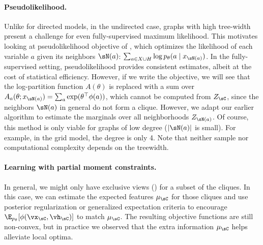 \paragraph{Pseudolikelihood.}
Unlike for directed models, in the undirected case,
graphs with high tree-width present a challenge
for even fully-supervised maximum likelihood.
This motivates looking at pseudolikelihood objective of \citep{besag75pseudo},
which optimizes the likelihood of each variable $a$ given its neighbors $\sN(a)$:
$\sum_{a \in X \cup H} \log p_\theta(a \mid x_{\sN(a)})$.
In the fully-supervised setting, pseudolikelihood provides consistent estimates,
albeit at the cost of statistical efficiency.
However, if we write the objective, we will see that the log-partition function $A(\theta)$
is replaced with a sum over $A_a(\theta; x_{\sN(a)}) = \sum_a \exp(\theta^\top\phi(a))$,
which cannot be computed from $Z_\sC$, since the neighbors $\sN(a)$ in general do not form a clique.
However, we adapt our earlier algorithm to estimate the marginals over all neighborhoods $Z_{\sN(a)}$.
Of course, this method is only viable for graphs of low degree ($|\sN(a)|$ is small).
For example, in the grid model, the degree is only 4.
Note that neither sample nor computational complexity depends on the treewidth.

\paragraph{Learning with partial moment constraints.}

In general, we might only have exclusive views () for a subset of the cliques.
In this case, we can estimate the expected features $\mu_\sC$ for those cliques
and use posterior regularization \citep{graca08em} or generalized expectation criteria \citep{mann08ge}
to encourage $\E_{p_\theta}[\phi(\vx_\sC,\vh_\sC)]$ to match $\mu_\sC$.
The resulting objective functions are still non-convex, but in practice we observed
that the extra information $\mu_\sC$ helps alleviate local optima.

